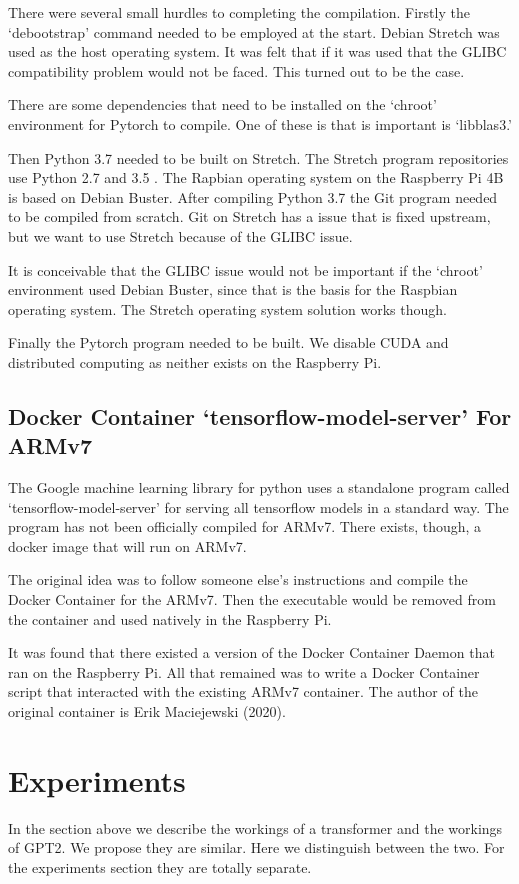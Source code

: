 There were several small hurdles to completing the compilation. Firstly the `debootstrap' command needed to be employed at the start. Debian Stretch was used as the host operating system. It was felt that if it was used that the GLIBC compatibility problem would not be faced. This turned out to be the case.

There are some dependencies that need to be installed on the `chroot' environment for Pytorch to compile. One of these is that is important is `libblas3.'

Then Python 3.7 needed to be built on Stretch. The Stretch program repositories use Python 2.7 and 3.5 . The Rapbian operating system on the Raspberry Pi 4B is based on Debian Buster. After compiling Python 3.7 the Git program needed to be compiled from scratch. Git on Stretch has a issue that is fixed upstream, but we want to use Stretch because of the GLIBC issue.

It is conceivable that the GLIBC issue would not be important if the `chroot' environment used Debian Buster, since that is the basis for the Raspbian operating system. The Stretch operating system solution works though.

Finally the Pytorch program needed to be built. We disable CUDA and distributed computing as neither exists on the Raspberry Pi.

\subsection*{Docker Container `tensorflow-model-server' For ARMv7}
The Google machine learning library for python uses a standalone program called `tensorflow-model-server' for serving all tensorflow models in a standard way. The program has not been officially compiled for ARMv7. There exists, though, a docker image that will run on ARMv7.

The original idea was to follow someone else's instructions and compile the Docker Container for the ARMv7. Then the executable would be removed from the container and used natively in the Raspberry Pi.

It was found that there existed a version of the Docker Container Daemon that ran on the Raspberry Pi. All that remained was to write a Docker Container script that interacted with the existing ARMv7 container. The author of the original container is Erik Maciejewski (2020)\cite{2020Maciejewski}.



\section{Experiments}
In the section above we describe the workings of a transformer and the workings of GPT2. We propose they are similar. Here we distinguish between the two. For the experiments section they are totally separate.

